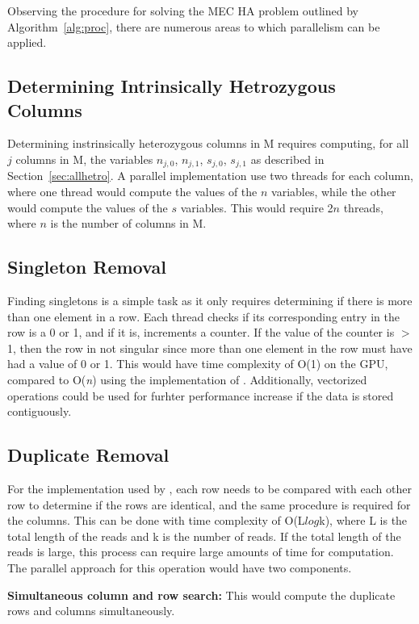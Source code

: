 \documentclass[10pt,a4paer,twocolumn]{article}
\begin{document}
Observing the procedure for solving the MEC HA problem outlined by Algorithm~\ref{alg:proc}, there are 
numerous areas to which parallelism can be applied.

\subsection{ Determining Intrinsically Hetrozygous Columns}

Determining instrinsically heterozygous columns in M requires computing, for all $j$ columns in M, the
variables $n_{j,0}$, $n_{j,1}$, $s_{j,0}$, $s_{j,1}$ as described in Section~\ref{sec:allhetro}.
A parallel implementation use two threads for each column, where one thread would compute the values of the
$n$ variables, while the other would compute the values of the $s$ variables. This would require 2$n$ threads,
where $n$ is the number of columns in M.

\subsection{Singleton Removal}

Finding singletons is a simple task as it only requires determining if there is more than one element in a
row. Each thread checks if  its corresponding entry in the row is a 0 or 1, and if it is, increments a
counter. If the value of the counter is $>$ 1, then the row in not singular since more than one element in 
the row must have had a value of 0 or 1. This would have time complexity of O(1) on the GPU, compared to 
O(\textit{n}) using the implementation of \cite{chen:2013}. Additionally, vectorized operations could be used
for furhter performance increase if the data is stored contiguously.

\subsection{Duplicate Removal}

For the implementation used by \cite{chen:2013}, each row needs to be compared with each other row to
determine if the rows are identical, and the same procedure is required for the columns. This can be done with
time complexity of O(L$log$k), where L is the total length of the reads and k is the number of reads. If the
total length of the reads is large, this process can require large amounts of time for computation. The 
parallel approach for this operation would have two components.

\textbf{Simultaneous column and row search:} This would compute the duplicate rows and columns simultaneously.
\end{document}
